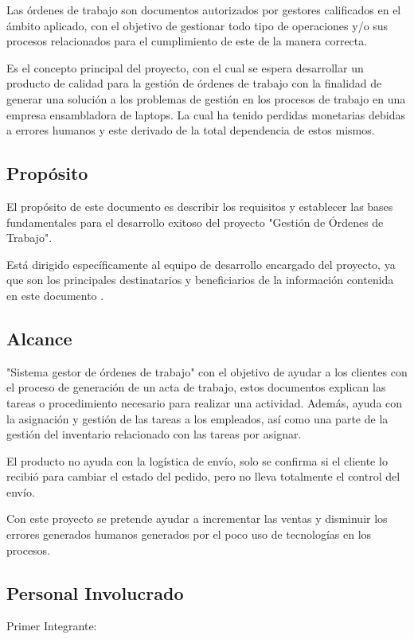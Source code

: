 \documentclass[12pt,a4paper, twosite]{article}
\begin{document}
Las órdenes de trabajo son documentos autorizados por gestores calificados en el ámbito aplicado, con el objetivo de gestionar todo tipo de operaciones y/o sus procesos relacionados para el cumplimiento de este de la manera correcta.

Es el concepto principal del proyecto, con el cual se espera desarrollar un producto de calidad para la gestión de órdenes de trabajo con la finalidad de generar una solución a los problemas de gestión en los procesos de trabajo en una empresa ensambladora de laptops. La cual ha tenido perdidas monetarias debidas a errores humanos y este derivado de la total dependencia de estos mismos.



\subsection{Propósito}
\label{sec:org434c3ef}

El propósito de este documento es describir los requisitos y establecer las bases fundamentales para el desarrollo exitoso del proyecto "Gestión de Órdenes de Trabajo". 

Está dirigido específicamente al equipo de desarrollo encargado del proyecto, ya que son los principales destinatarios y beneficiarios de la información contenida en este documento . 

\subsection{Alcance}
\label{sec:org12e44a1}


"Sistema gestor de órdenes de trabajo" con el objetivo de ayudar a los clientes con el proceso de generación de un acta de trabajo, estos documentos explican las tareas o procedimiento necesario para realizar una actividad.
Además, ayuda con la asignación y gestión de las tareas a los empleados, así como una parte de la gestión del inventario relacionado con las tareas por asignar. 

El producto no ayuda con la logística de envío, solo se confirma si el cliente lo recibió para cambiar el estado del pedido, pero no lleva totalmente el control del envío.

Con este proyecto se pretende ayudar a incrementar las ventas y disminuir los errores generados humanos generados por el poco uso de tecnologías en los procesos.

\subsection{Personal Involucrado}
\label{sec:org12e44a1}
Primer Integrante:
\end{document}
